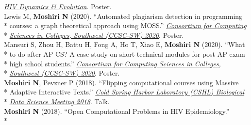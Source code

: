 \documentclass[margin,line]{res}
\begin{document}
\begin{resume}
\hspace*{8mm} \href{https://cme.ucsd.edu/hivdynamics/}{\textit{HIV Dynamics \& Evolution}}. Poster.\\
\hspace*{4mm} Lewis M, \textbf{Moshiri N} (2020). ``Automated plagiarism detection in programming\\*
\hspace*{9.5mm} courses: a graph theoretical approach using MOSS.'' \href{http://ccsc.org/southwestern/2020/index.php}{\textit{Consortium for Computing}}\\*\vspace{2mm}
\hspace*{8mm} \href{http://ccsc.org/southwestern/2020/index.php}{\textit{Sciences in Colleges, Southwest (CCSC-SW) 2020}}. Poster.\\
\hspace*{4mm} Mansuri S, Zhou H, Battu H, Fong A, Ho T, Xiao E, \textbf{Moshiri N} (2020). ``What\\*
\hspace*{9.5mm} to do after AP CS? A case study on short technical modules for post-AP-exam\\*
\hspace*{9.5mm} high school students.'' \href{http://ccsc.org/southwestern/2020/index.php}{\textit{Consortium for Computing Sciences in Colleges,}}\\*\vspace{2mm}
\hspace*{8mm} \href{http://ccsc.org/southwestern/2020/index.php}{\textit{Southwest (CCSC-SW) 2020}}. Poster.\\
\hspace*{4mm} \textbf{Moshiri N}, Pevzner P (2018). ``Flipping computational courses using Massive\\*
\hspace*{9.5mm} Adaptive Interactive Texts.'' \href{http://meetings.cshl.edu/meetings.aspx?meet=DATA&year=18}{\textit{Cold Spring Harbor Laboratory (CSHL) Biological}}\\*\vspace{2mm}
\hspace*{8mm} \href{http://meetings.cshl.edu/meetings.aspx?meet=DATA&year=18}{\textit{Data Science Meeting 2018}}. Talk.\\
\hspace*{4mm} \textbf{Moshiri N} (2018). ``Open Computational Problems in HIV Epidemiology.''\\*\vspace{2mm}

\end{resume}
\end{document}

